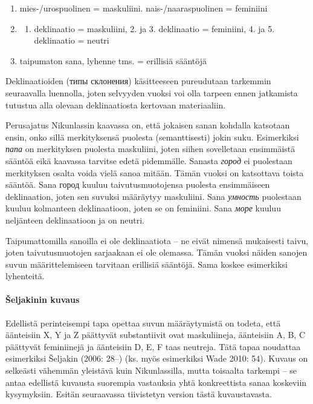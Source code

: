 \documentclass[]{scrartcl}
\providecommand{\tightlist}{%
  \setlength{\itemsep}{0pt}\setlength{\parskip}{0pt}}
\begin{document}
\begin{enumerate}
\def\labelenumi{\arabic{enumi}.}
\item
  mies-/urospuolinen = maskuliini. nais-/naaraspuolinen = feminiini
\item
  \begin{enumerate}
  \def\labelenumii{\arabic{enumii}.}
  \tightlist
  \item
    deklinaatio = maskuliini, 2. ja 3. deklinaatio = feminiini, 4. ja 5.
    deklinaatio = neutri
  \end{enumerate}
\item
  taipumaton sana, lyhenne tms. = erillisiä sääntöjä
\end{enumerate}

Deklinaatioiden (типы склонения) käsitteeseen pureudutaan tarkemmin
seuraavalla luennolla, joten selvyyden vuoksi voi olla tarpeen ennen
jatkamista tutustua alla olevaan deklinaatiosta kertovaan materiaaliin.

Perusajatus Nikunlassin kaavassa on, että jokaisen sanan kohdalla
katsotaan ensin, onko sillä merkityksensä puolesta (semanttisesti) jokin
suku. Esimerkiksi \emph{папа} on merkityksen puolesta maskuliini, joten
siihen sovelletaan ensimmäistä sääntöä eikä kaavassa tarvitse edetä
pidemmälle. Sanasta \emph{город} ei puolestaan merkityksen osalta voida
vielä sanoa mitään. Tämän vuoksi on katsottava toista sääntöä. Sana
город kuuluu taivutusmuotojensa puolesta ensimmäiseen deklinaation,
joten sen suvuksi määräytyy maskuliini. Sana \emph{умность} puolestaan
kuuluu kolmanteen deklinaatioon, joten se on feminiini. Sana \emph{море}
kuuluu neljänteen deklinaatioon ja on neutri.

Taipumattomilla sanoilla ei ole deklinaatiota -- ne eivät nimensä
mukaisesti taivu, joten taivutusmuotojen sarjaakaan ei ole olemassa.
Tämän vuoksi näiden sanojen suvun määrittelemiseen tarvitaan erillisiä
sääntöjä. Sama koskee esimerkiksi lyhenteitä.

\paragraph{Šeljakinin kuvaus}\label{ux161eljakinin-kuvaus}

Edellistä perinteisempi tapa opettaa suvun määräytymistä on todeta, että
äänteisiin X, Y ja Z päättyvät substantiivit ovat maskuliineja,
äänteisiin A, B, C päättyvät feminiinejä ja äänteisiin D, E, F taas
neutreja. Tätä tapaa noudattaa esimerkiksi Šeljakin (2006: 28--) (ks.
myös esimerkiksi Wade 2010: 54). Kuvaus on selkeästi vähemmän yleistävä
kuin Nikunlassilla, mutta toisaalta tarkempi -- se antaa edellistä
kuvausta suorempia vastauksia yhtä konkreettista sanaa koskeviin
kysymyksiin. Esitän seuraavassa tiivistetyn version tästä kuvaustavasta.
\end{document}
